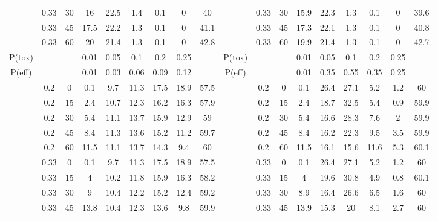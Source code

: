 \begin{table}
{\begin{tabular}[t]{cccccccc>{}c|ccccccccc}
			& 0.33 & 30 & 16 & 22.5 & 1.4 & 0.1 & 0 & 40 &  & 0.33 & 30 & 15.9 & 22.3 & 1.3 & 0.1 & 0 & 39.6\\
			
			& 0.33 & 45 & 17.5 & 22.2 & 1.3 & 0.1 & 0 & 41.1 &  & 0.33 & 45 & 17.3 & 22.1 & 1.3 & 0.1 & 0 & 40.8\\
			
			\multirow{-10}{*}{\centering\arraybackslash 2} & 0.33 & 60 & 20 & 21.4 & 1.3 & 0.1 & 0 & 42.8 & \multirow{-10}{*}{\centering\arraybackslash 8} & 0.33 & 60 & 19.9 & 21.4 & 1.3 & 0.1 & 0 & 42.7\\
			\cmidrule{1-18}
			P(tox) &  &  & 0.01 & 0.05 & 0.1 & 0.2 & 0.25 &  & P(tox) &  &  & 0.01 & 0.05 & 0.1 & 0.2 & 0.25 \vphantom{1} & \\
			\cmidrule{1-18}
			P(eff) &  &  & 0.01 & 0.03 & 0.06 & 0.09 & 0.12 &  & P(eff) &  &  & 0.01 & 0.35 & 0.55 & 0.35 & 0.25 \vphantom{1} & \\
			\cmidrule{1-18}
			& 0.2 & 0 & 0.1 & 9.7 & 11.3 & 17.5 & 18.9 & 57.5 &  & 0.2 & 0 & 0.1 & 26.4 & 27.1 & 5.2 & 1.2 & 60\\
			
			& 0.2 & 15 & 2.4 & 10.7 & 12.3 & 16.2 & 16.3 & 57.9 &  & 0.2 & 15 & 2.4 & 18.7 & 32.5 & 5.4 & 0.9 & 59.9\\
			
			& 0.2 & 30 & 5.4 & 11.1 & 13.7 & 15.9 & 12.9 & 59 &  & 0.2 & 30 & 5.4 & 16.6 & 28.3 & 7.6 & 2 & 59.9\\
			
			& 0.2 & 45 & 8.4 & 11.3 & 13.6 & 15.2 & 11.2 & 59.7 &  & 0.2 & 45 & 8.4 & 16.2 & 22.3 & 9.5 & 3.5 & 59.9\\
			
			& 0.2 & 60 & 11.5 & 11.1 & 13.7 & 14.3 & 9.4 & 60 &  & 0.2 & 60 & 11.5 & 16.1 & 15.6 & 11.6 & 5.3 & 60.1\\
			
			& 0.33 & 0 & 0.1 & 9.7 & 11.3 & 17.5 & 18.9 & 57.5 &  & 0.33 & 0 & 0.1 & 26.4 & 27.1 & 5.2 & 1.2 & 60\\
			
			& 0.33 & 15 & 4 & 10.2 & 11.8 & 15.9 & 16.3 & 58.2 &  & 0.33 & 15 & 4 & 19.6 & 30.8 & 4.9 & 0.8 & 60.1\\
			
			& 0.33 & 30 & 9 & 10.4 & 12.2 & 15.2 & 12.4 & 59.2 &  & 0.33 & 30 & 8.9 & 16.4 & 26.6 & 6.5 & 1.6 & 60\\
			
			& 0.33 & 45 & 13.8 & 10.4 & 12.3 & 13.6 & 9.8 & 59.9 &  & 0.33 & 45 & 13.9 & 15.3 & 20 & 8.1 & 2.7 & 60\\
			

\end{tabular}}
\end{table}
